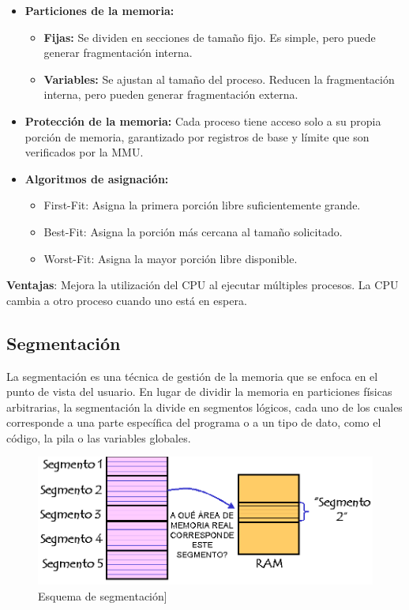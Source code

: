  \begin{itemize}
 
 	\item \textbf{Particiones de la memoria:}
 	\begin{itemize}
 		\item\textbf{ Fijas: }Se dividen en secciones de tamaño fijo. Es simple, pero puede generar fragmentación interna.
 		\item \textbf{Variables: }Se ajustan al tamaño del proceso. Reducen la fragmentación interna, pero pueden generar fragmentación externa.
 	\end{itemize}
 		\item \textbf{Protección de la memoria: }Cada proceso tiene acceso solo a su propia porción de memoria, garantizado por registros de base y límite que son verificados por la MMU.
 	\item \textbf{Algoritmos de asignación:}
 	\begin{itemize}
 		\item First-Fit: Asigna la primera porción libre suficientemente grande.
 		\item Best-Fit: Asigna la porción más cercana al tamaño solicitado.
 		\item Worst-Fit: Asigna la mayor porción libre disponible.
 	\end{itemize}
 \end{itemize}
 
 \textbf{Ventajas}: Mejora la utilización del CPU al ejecutar múltiples procesos. La CPU cambia a otro proceso cuando uno está en espera.
 

 
 
 
\subsection{Segmentación}

La segmentación es una técnica de gestión de la memoria que se enfoca en el punto de vista del usuario. En lugar de dividir la memoria en particiones físicas arbitrarias, la segmentación la divide en segmentos lógicos, cada uno de los cuales corresponde a una parte específica del programa o a un tipo de dato, como el código, la pila o las variables globales.

\begin{figure}[H] \centering \includegraphics[width=0.6\linewidth]{Imagenes/segmentacion.png} \caption{Esquema de segmentación]} \end{figure}


